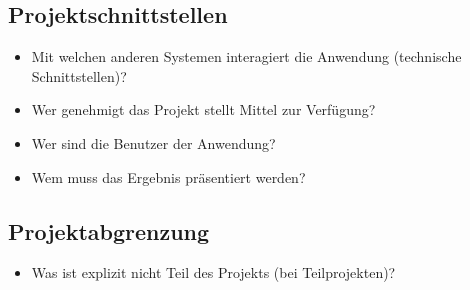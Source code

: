 \subsection{Projektschnittstellen} 
\label{sec:Projektschnittstellen}
\begin{itemize}
	\item Mit welchen anderen Systemen interagiert die Anwendung (technische Schnittstellen)?
	\item Wer genehmigt das Projekt \bzw stellt Mittel zur Verfügung? 
	\item Wer sind die Benutzer der Anwendung?
	\item Wem muss das Ergebnis präsentiert werden?
\end{itemize}


\subsection{Projektabgrenzung} 
\label{sec:Projektabgrenzung}
\begin{itemize}
	\item Was ist explizit nicht Teil des Projekts (\insb bei Teilprojekten)?
\end{itemize}
